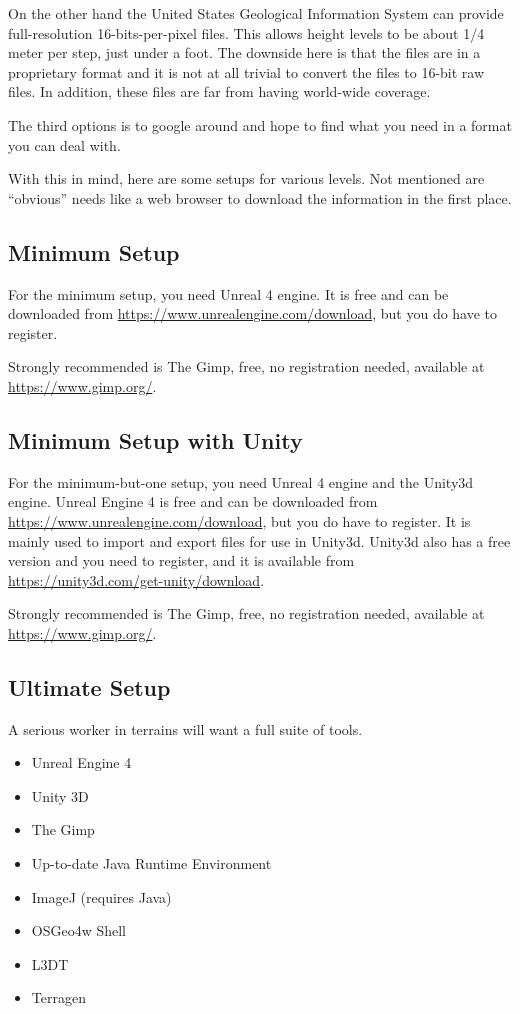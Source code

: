 \documentclass[letter,12pt]{article}
\begin{document}
On the other hand the United States Geological Information System can provide full-resolution 16-bits-per-pixel files.  This allows height levels to be about 1/4 meter per step, just under a foot.  The downside here is that the files are in a proprietary format and it is not at all trivial to convert the files to 16-bit raw files.   In addition, these files are far from having world-wide coverage.  

The third options is to google around and hope to find what you need in a format you can deal with.

With this in mind, here are some setups for various levels.  Not mentioned are “obvious” needs like a web browser to download the information in the first place.

\subsection{Minimum Setup}

For the minimum setup, you need Unreal 4 engine.  It is free and can be downloaded from \url{https://www.unrealengine.com/download}, but you do have to register.

Strongly recommended is The Gimp, free, no registration needed, available at \url{https://www.gimp.org/}.

\subsection{Minimum Setup with Unity}

For the minimum-but-one setup, you need Unreal 4 engine and the Unity3d engine.  Unreal Engine 4 is free and can be downloaded from \url{https://www.unrealengine.com/download}, but you do have to register.  It is mainly used to import and export files for use in Unity3d.  Unity3d also has a free version and you need to register, and it is available from \url{https://unity3d.com/get-unity/download}.  

Strongly recommended is The Gimp, free, no registration needed, available at \url{https://www.gimp.org/}.

\subsection{Ultimate Setup}

A serious worker in terrains will want a full suite of tools.  

\begin{itemize}
\item Unreal Engine 4
\item Unity 3D
\item The Gimp
\item Up-to-date Java Runtime Environment
\item ImageJ (requires Java)
\item OSGeo4w Shell
\item L3DT 
\item Terragen
\end{itemize}
\end{document}
